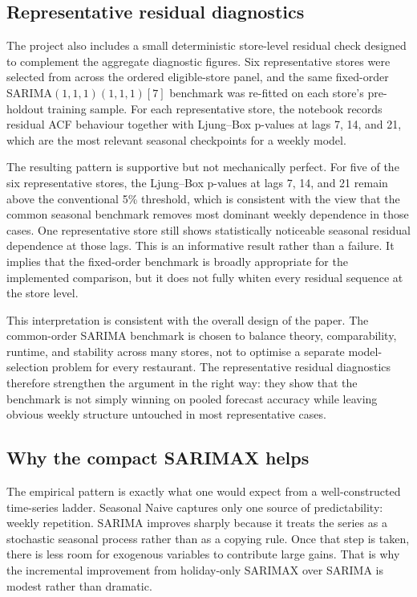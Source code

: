 \documentclass[11pt,oneside]{scrartcl}
\begin{document}
\subsection{Representative residual diagnostics}
The project also includes a small deterministic store-level residual check designed to complement the aggregate diagnostic figures. Six representative stores were selected from across the ordered eligible-store panel, and the same fixed-order SARIMA$(1,1,1)(1,1,1)[7]$ benchmark was re-fitted on each store's pre-holdout training sample. For each representative store, the notebook records residual ACF behaviour together with Ljung--Box p-values at lags 7, 14, and 21, which are the most relevant seasonal checkpoints for a weekly model.

The resulting pattern is supportive but not mechanically perfect. For five of the six representative stores, the Ljung--Box p-values at lags 7, 14, and 21 remain above the conventional 5\% threshold, which is consistent with the view that the common seasonal benchmark removes most dominant weekly dependence in those cases. One representative store still shows statistically noticeable seasonal residual dependence at those lags. This is an informative result rather than a failure. It implies that the fixed-order benchmark is broadly appropriate for the implemented comparison, but it does not fully whiten every residual sequence at the store level.

This interpretation is consistent with the overall design of the paper. The common-order SARIMA benchmark is chosen to balance theory, comparability, runtime, and stability across many stores, not to optimise a separate model-selection problem for every restaurant. The representative residual diagnostics therefore strengthen the argument in the right way: they show that the benchmark is not simply winning on pooled forecast accuracy while leaving obvious weekly structure untouched in most representative cases.

\subsection{Why the compact SARIMAX helps}
The empirical pattern is exactly what one would expect from a well-constructed time-series ladder. Seasonal Naive captures only one source of predictability: weekly repetition. SARIMA improves sharply because it treats the series as a stochastic seasonal process rather than as a copying rule. Once that step is taken, there is less room for exogenous variables to contribute large gains. That is why the incremental improvement from holiday-only SARIMAX over SARIMA is modest rather than dramatic.
\end{document}
